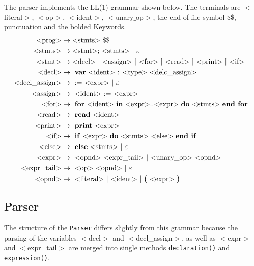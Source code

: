 \documentclass[a4paper]{article}
\newcommand*{\code}[1]{\texttt{#1}}
\begin{document}
\newcommand{\cfgvar}[1]{$<$#1$>$}
\newcommand{\cfgrule}[2]{\text{\cfgvar{#1}} &\rightarrow \text{#2}}
\newcommand{\cfgterm}[1]{\textbf{#1}}
The parser implements the LL(1) grammar shown below.
The terminals are \cfgvar{literal}, \cfgvar{op}, \cfgvar{ident}, 
\cfgvar{unary$\_$op}, the end-of-file symbol \$\$, punctuation 
and the bolded Keywords.
\begin{align*}
  \cfgrule{prog}{\cfgvar{stmts} \$\$} \\
  \cfgrule{stmts}{\cfgvar{stmt}; \cfgvar{stmts} $\mid$ $\varepsilon$} \\
  \cfgrule{stmt}{\cfgvar{decl} $\mid$ 
                 \cfgvar{assign} $\mid$
                 \cfgvar{for} $\mid$ 
                 \cfgvar{read} $\mid$ 
                 \cfgvar{print} $\mid$ 
                 \cfgvar{if} } \\
  \cfgrule{decl}{
    \cfgterm{var} \cfgvar{ident} : \cfgvar{type} \cfgvar{delc\_assign}
  } \\
  \cfgrule{decl\_assign}{
     := \cfgvar{expr} $\mid$ $\varepsilon$
  }\\
  \cfgrule{assign}{
    \cfgvar{ident} := \cfgvar{expr}
  } \\
  \cfgrule{for}{
    \cfgterm{for} \cfgvar{ident} \cfgterm{in} 
    \cfgvar{expr}..\cfgvar{expr} \cfgterm{do} \cfgvar{stmts} 
    \cfgterm{end for}
  } \\
  \cfgrule{read}{
    \cfgterm{read} \cfgvar{ident}
  } \\
  \cfgrule{print}{
    \cfgterm{print} \cfgvar{expr}
  } \\ 
  \cfgrule{if}{
    \cfgterm{if} \cfgvar{expr} \cfgterm{do} \cfgvar{stmts}
    \cfgvar{else} \cfgterm{end if}
  } \\
  \cfgrule{else}{
    \cfgterm{else} \cfgvar{stmts} $\mid$ $\varepsilon$
  } \\
  \cfgrule{expr}{ 
    \cfgvar{opnd} \cfgvar{expr$\_$tail} 
    $\mid$ \cfgvar{unary$\_$op} \cfgvar{opnd}
  } \\
  \cfgrule{expr$\_$tail}{
    \cfgvar{op} \cfgvar{opnd} $\mid$ $\varepsilon$
  } \\
  \cfgrule{opnd}{
    \cfgvar{literal} $\mid$ \cfgvar{ident} 
    $\mid$ \cfgterm{(} \cfgvar{expr} \cfgterm{)}
  } \\
\end{align*}

\subsection{Parser}
The structure of the \code{Parser} differs slightly from this grammar 
because the parsing of the variables \cfgvar{decl} and \cfgvar{decl\_assign}, as well 
as \cfgvar{expr} and \cfgvar{expr\_tail} are merged into single 
methods \code{declaration()} and \code{expression()}.
\end{document}
